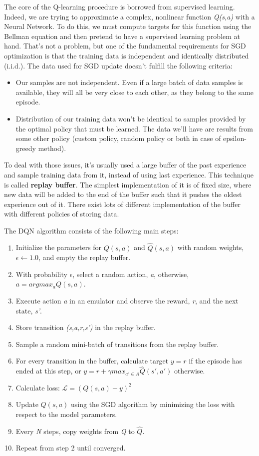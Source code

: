 \documentclass[12pt]{article}
\begin{document}
The core of the Q-learning procedure is borrowed from supervised learning. Indeed, we are trying to approximate a complex, nonlinear function \textit{Q(s,a)} with a Neural Network. To do this, we must compute targets for this function using the Bellman equation and then pretend to have a supervised learning problem at hand. That's not a problem, but one of the fundamental requirements for SGD optimization is that the training data is independent and identically distributed (i.i.d.). The data used for SGD update doesn't fulfill the following criteria:
\begin{itemize}
    \item Our samples are not independent. Even if a large batch of data samples is available, they will all be very close to each other, as they belong to the same episode.
    \item Distribution of our training data won't be identical to samples provided by the optimal policy that must be learned. The data we'll have are results from some other policy (custom policy, random policy or both in case of epsilon-greedy method). 
\end{itemize}

To deal with those issues, it's usually used a large buffer of the past experience and sample training data from it, instead of using last experience. This technique is called \textbf{replay buffer}. The simplest implementation of it is of fixed size, where new data will be added to the end of the buffer such that it pushes the oldest experience out of it. There exist lots of different implementation of the buffer with different policies of storing data. 

The DQN algorithm consists of the following main steps:
\begin{enumerate}
    \item Initialize the parameters for $Q(s,a)$ and $\hat{Q}(s,a)$ with random weights, $\epsilon \leftarrow 1.0$, and empty the replay buffer.
    \item With probability $\epsilon$, select a random action, \textit{a}, otherwise, $a=argmax_aQ(s,a)$.
    \item Execute action \textit{a} in an emulator and observe the reward, \textit{r}, and the next state, \textit{s'}.
    \item Store transition \textit{(s,a,r,s')} in the replay buffer.
    \item Sample a random mini-batch of transitions from the replay buffer.
    \item For every transition in the buffer, calculate target $y=r$ if the episode has ended at this step, or $y=r+\gamma max_{a' \in A} \hat{Q}(s',a')$ otherwise.
    \item Calculate loss: $\mathcal{L}=(Q(s,a) - y)^2$
    \item Update $Q(s,a)$ using the SGD algorithm by minimizing the loss with respect to the model parameters.
    \item Every \textit{N} steps, copy weights from \textit{Q} to $\hat{Q}$.
    \item Repeat from step 2 until converged.
    \end{enumerate}
\end{document}
